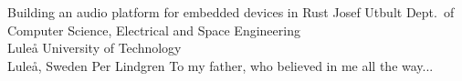 \documentclass[12pt,a4paper,openright,final,twoside]{LTU-Report-Theme/cseethesis}
\begin{document}

	

	\graphicspath{{img/}}


	\def\thesistitle{Building an audio platform for embedded devices in Rust}

	\def\theauthor{Josef Utbult}
	\def\theaddress{Dept.\ of Computer Science, Electrical and Space Engineering\\
	Luleå University of Technology\\ Luleå, Sweden}

	\def\supervisors{Per Lindgren}

	\def\supervisorstring{Supervisor:} 

	\def\dedication{To my father, who believed in me all the way...}

	\def\theabstract{}
	\def\thepreface{}

	\createpreamble
		{\thesistitle}
		{\theauthor}
		{\theaddress}
		{\supervisors}
		{\dedication}
		{\theabstract}
		{\thepreface}

	\startchapters
	\begin{bibunit}[IEEEtran]

		
		
		
		
		
		
		

	\printglossary[type=\acronymtype]

	\makebib

	\end{bibunit}
\end{document}
